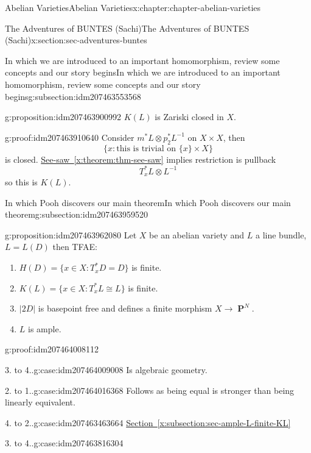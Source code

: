 \documentclass[oneside,10pt,]{book}
\numberwithin{equation}{section}
\DeclareMathOperator{\PP}{\mathbf{P}}
\begin{document}
\begin{chapterptx}{Abelian Varieties}{}{Abelian Varieties}{}{}{x:chapter:chapter-abelian-varieties}
\begin{sectionptx}{The Adventures of BUNTES (Sachi)}{}{The Adventures of BUNTES (Sachi)}{}{}{x:section:sec-adventures-buntes}
\begin{subsectionptx}{In which we are introduced to an important homomorphism, review some concepts and our story begins}{}{In which we are introduced to an important homomorphism, review some concepts and our story begins}{}{}{g:subsection:idm207463553568}
\begin{proposition}{}{}{g:proposition:idm207463900992}
\(K(L)\) is Zariski closed in \(X\).%
\end{proposition}
\begin{proofptx}{}{g:proof:idm207463910640}
Consider \(m^* L \otimes p_2^*L^{-1}\) on \(X\times X\), then%
\begin{equation*}
\{x : \text{this is trivial on }\{x\}\times X\}
\end{equation*}
is closed. \hyperref[x:theorem:thm-see-saw]{See-saw~\ref{x:theorem:thm-see-saw}} implies restriction is pullback%
\begin{equation*}
T_x^*L \otimes L^{-1}
\end{equation*}
so this is \(K(L)\).%
\end{proofptx}
\end{subsectionptx}
%
%
\typeout{************************************************}
\typeout{************************************************}
%
\begin{subsectionptx}{In which Pooh discovers our main theorem}{}{In which Pooh discovers our main theorem}{}{}{g:subsection:idm207463959520}
\begin{proposition}{}{}{g:proposition:idm207463962080}%
Let \(X\) be an abelian variety and \(L\) a line bundle, \(L = L(D)\) then TFAE:%
\begin{enumerate}
\item{}\(H(D) = \{x\in X: T_x^*D  = D \}\) is finite.%
\item{}\(K(L) = \{x\in X: T_x^*L  \cong L \}\) is finite.%
\item{}\(|2D|\) is basepoint free and defines a finite morphism \(X\to \PP^N\).%
\item{}\(L\) is ample.%
\end{enumerate}
%
\end{proposition}
\begin{proofptx}{}{g:proof:idm207464008112}
\begin{case}{}{3. to 4..}{g:case:idm207464009008}
Is algebraic geometry.%
\end{case}
\begin{case}{}{2. to 1..}{g:case:idm207464016368}
Follows as being equal is stronger than being linearly equivalent.%
\end{case}
\begin{case}{}{4. to 2..}{g:case:idm207463463664}
\hyperref[x:subsection:sec-ample-L-finite-KL]{Section~\ref{x:subsection:sec-ample-L-finite-KL}}%
\end{case}
\begin{case}{}{3. to 4..}{g:case:idm207463816304}

\end{case}
\end{proofptx}
\end{subsectionptx}
\end{sectionptx}
\end{chapterptx}
\end{document}
